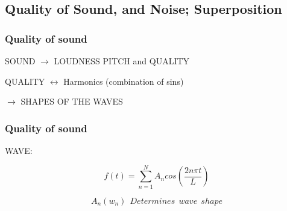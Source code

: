 \documentclass[]{beamer}
\begin{document}











\subsection{Quality of Sound, and Noise;
Superposition}

\begin{frame}
\frametitle{Quality of sound}

SOUND \pause $\rightarrow$ LOUDNESS \pause PITCH and \textcolor{mypink1}{QUALITY}

\pause
\vspace{3mm}

QUALITY \pause $\leftrightarrow$ Harmonics (combination of sins) 

\pause
\vspace{3mm}

$\rightarrow $ SHAPES OF THE WAVES

\end{frame}







\begin{frame}
\frametitle{Quality of sound}

WAVE:

\begin{equation*}
  f(t)=\sum^{N}_{n=1} A_n cos\left(\frac{2n\pi t}{L}\right)
\end{equation*}

\pause
\vspace{5mm}

\begin{equation*}
  A_n(w_n)~~Determines~~wave~~shape
\end{equation*}

\end{frame}
\end{document}
